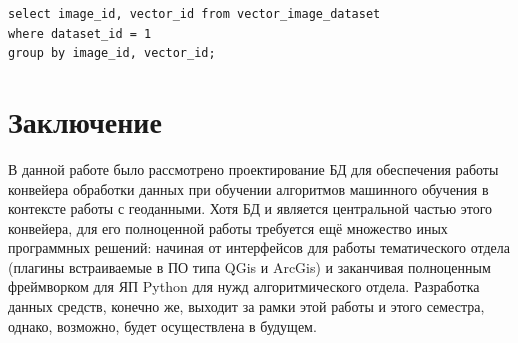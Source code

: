 \documentclass[a4paper]{article}
\begin{document}
\begin{lstlisting}[captionpos=b, caption={Получение всех пар изображений для данного датасета}]
select image_id, vector_id from vector_image_dataset
where dataset_id = 1
group by image_id, vector_id;
\end{lstlisting}

\section{Заключение}
В данной работе было рассмотрено проектирование БД для обеспечения работы конвейера обработки данных при обучении алгоритмов машинного обучения в контексте работы с геоданными.
Хотя БД и является центральной частью этого конвейера, для его полноценной работы требуется ещё множество иных программных решений: начиная от интерфейсов для работы тематического отдела (плагины встраиваемые в ПО типа QGis и ArcGis) и заканчивая полноценным фреймворком для ЯП Python для нужд алгоритмического отдела.
Разработка данных средств, конечно же, выходит за рамки этой работы и этого семестра, однако, возможно, будет осуществлена в будущем.
	
\end{document}
